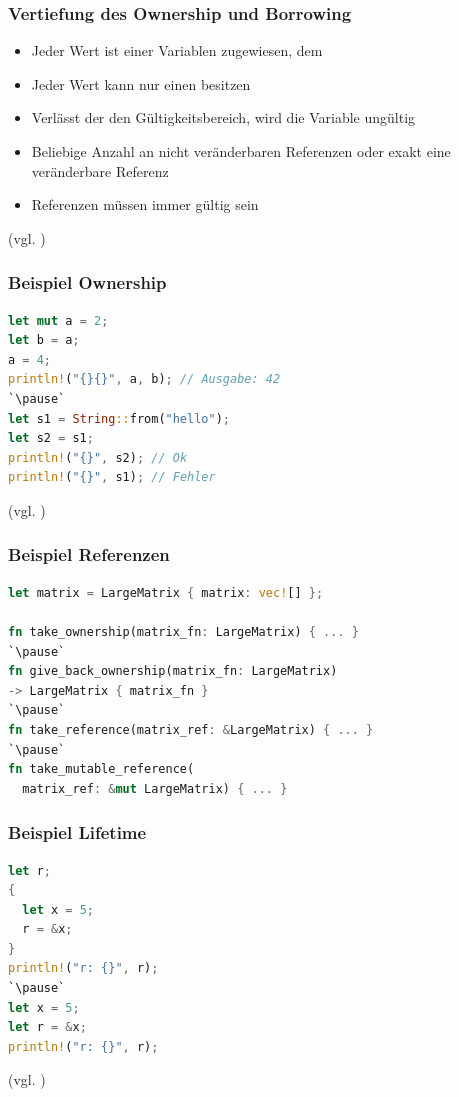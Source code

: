 \documentclass{beamer}
\begin{document}
\begin{frame}[fragile]
  \frametitle{Vertiefung des Ownership und Borrowing}
  \begin{itemize}
    \item Jeder Wert ist einer Variablen zugewiesen, dem  
    \pause
    \item Jeder Wert kann nur einen  besitzen
    \pause
    \item Verlässt der  den Gültigkeitsbereich, wird die Variable ungültig
    \pause
    \item Beliebige Anzahl an nicht veränderbaren Referenzen oder exakt eine veränderbare Referenz
    \pause
    \item Referenzen müssen immer gültig sein
  \end{itemize}
  {\small (vgl. \cite{Rules1} \cite{Rules2})}
\end{frame}

\begin{frame}[fragile]
  \frametitle{Beispiel Ownership}
  \begin{lstlisting}[language=rust]
let mut a = 2;
let b = a;
a = 4;
println!("{}{}", a, b); // Ausgabe: 42
`\pause`
let s1 = String::from("hello");
let s2 = s1;
println!("{}", s2); // Ok
println!("{}", s1); // Fehler\end{lstlisting}
  {\small (vgl. \cite{Rules1} \cite{Rules2})}
\end{frame}

\begin{frame}[fragile]
  \frametitle{Beispiel Referenzen}
  \begin{lstlisting}[language=rust]
let matrix = LargeMatrix { matrix: vec![] };

fn take_ownership(matrix_fn: LargeMatrix) { ... }
`\pause`
fn give_back_ownership(matrix_fn: LargeMatrix) 
-> LargeMatrix { matrix_fn }
`\pause`
fn take_reference(matrix_ref: &LargeMatrix) { ... }
`\pause`
fn take_mutable_reference(
  matrix_ref: &mut LargeMatrix) { ... }\end{lstlisting}
\end{frame}

\begin{frame}[fragile]
  \frametitle{Beispiel Lifetime}
  \begin{lstlisting}[language=rust]
let r;
{
  let x = 5;
  r = &x;
} 
println!("r: {}", r);
`\pause`
let x = 5;
let r = &x;
println!("r: {}", r);
\end{lstlisting}
{\small (vgl. \cite{LifetimeEx})}
\end{frame}
\end{document}
